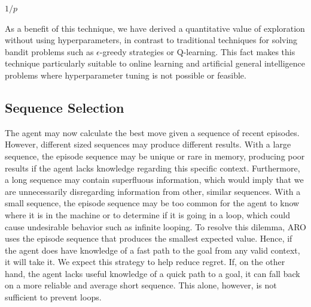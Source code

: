 \documentclass[letterpaper]{article} %
\begin{document}
\begin{algorithmic}[-1]
	
		\State \Return $1/p$
	\EndFunction
	
\end{algorithmic}

As a benefit of this technique, we have derived a quantitative value of exploration without using hyperparameters, in contrast to traditional techniques for solving bandit problems such as $\epsilon$-greedy strategies or Q-learning. This fact makes this technique particularly suitable to online learning and artificial general intelligence problems where hyperparameter tuning is not possible or feasible.

\subsection{Sequence Selection}

The agent may now calculate the best move given a sequence of recent episodes. However, different sized sequences may produce different results. With a large sequence, the episode sequence may be unique or rare in memory, producing poor results if the agent lacks knowledge regarding this specific context. Furthermore, a long sequence may contain superfluous information, which would imply that we are unnecessarily disregarding information from other, similar sequences. With a small sequence, the episode sequence may be too common for the agent to know where it is in the machine or to determine if it is going in a loop, which could cause undesirable behavior such as infinite looping. To resolve this dilemma, ARO uses the episode sequence that produces the smallest expected value. Hence, if the agent does have knowledge of a fast path to the goal from any valid context, it will take it. We expect this strategy to help reduce regret. If, on the other hand, the agent lacks useful knowledge of a quick path to a goal, it can fall back on a more reliable and average short sequence. This alone, however, is not sufficient to prevent loops.
\end{document}
